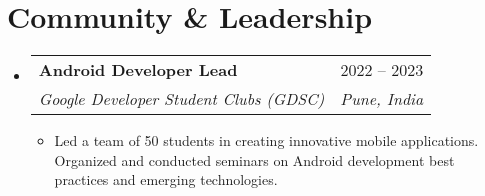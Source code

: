 \documentclass[letterpaper, 15pt]{article}
\makeatletter
\newcommand{\resumeItem}[1]{
  \item\small{
    {#1 \vspace{-5pt}}
  }
}
\newcommand{\resumeSubheading}[4]{
  \vspace{-3pt}\item
    \begin{tabular*}{0.97\textwidth}[t]{l@{\extracolsep{\fill}}r}
      \textbf{#1} & #2 \\
      \textit{\small#3} & \textit{\small #4} \\
    \end{tabular*}\vspace{-4pt}
}
\newcommand{\resumeSubHeadingListStart}{\begin{itemize}[leftmargin=0.15in, label={}]}
\newcommand{\resumeSubHeadingListEnd}{\end{itemize}}
\newcommand{\resumeItemListStart}{\begin{itemize}}
\newcommand{\resumeItemListEnd}{\end{itemize}\vspace{-4pt}}
\makeatother
\begin{document}
\section{Community \& Leadership}
  \resumeSubHeadingListStart
    \resumeSubheading
      {Android Developer Lead}{2022 -- 2023}
      {Google Developer Student Clubs (GDSC)}{Pune, India}
      \resumeItemListStart
        \resumeItem{Led a team of 50 students in creating innovative mobile applications. Organized and conducted seminars on Android development best practices and emerging technologies.}
      \resumeItemListEnd
  \resumeSubHeadingListEnd

\end{document}
